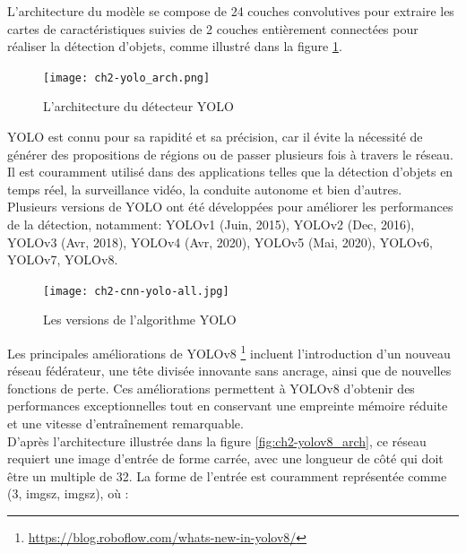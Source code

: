 L'architecture du modèle \cite{ch2_YOLOdéte70} se compose de 24 couches convolutives pour extraire les cartes de caractéristiques suivies de 2 couches entièrement connectées pour réaliser la détection d'objets, comme illustré dans la figure \ref{YOLOarc}.
\begin{figure}[H]
	\centering
	\texttt{[image: ch2-yolo\_arch.png]}
	\caption{L'architecture du détecteur YOLO}
 \label{YOLOarc}
\end{figure}

YOLO est connu pour sa rapidité et sa précision, car il évite la nécessité de générer des propositions de régions ou de passer plusieurs fois à travers le réseau. Il est couramment utilisé dans des applications telles que la détection d'objets en temps réel, la surveillance vidéo, la conduite autonome et bien d'autres.
\\
Plusieurs versions de YOLO \cite{AGuideto8}ont été développées pour améliorer les performances de la détection, notamment:
YOLOv1 (Juin, 2015),
YOLOv2 (Dec, 2016),
YOLOv3 (Avr, 2018),
YOLOv4 (Avr, 2020),
YOLOv5 (Mai, 2020),
YOLOv6,
YOLOv7,
YOLOv8.

\begin{figure}[H]
	\centering
	\texttt{[image: ch2-cnn-yolo-all.jpg]}
	\caption{Les versions de l'algorithme YOLO}
 \label{YOLO}
\end{figure}

Les principales améliorations de YOLOv8 \footnote{\url{https://blog.roboflow.com/whats-new-in-yolov8/}} incluent l'introduction d'un nouveau réseau fédérateur, une tête divisée innovante sans ancrage, ainsi que de nouvelles fonctions de perte. Ces améliorations permettent à YOLOv8 d'obtenir des performances exceptionnelles tout en conservant une empreinte mémoire réduite et une vitesse d'entraînement remarquable.\\
D'après l'architecture illustrée dans la figure \ref{fig:ch2-yolov8_arch}, ce réseau requiert une image d'entrée de forme carrée, avec une longueur de côté qui doit être un multiple de 32. La forme de l'entrée est couramment représentée comme (3, imgsz, imgsz), où :

